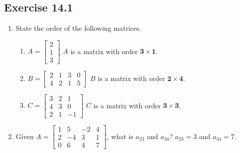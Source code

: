 \documentclass{report}
\begin{document}
\begin{multicols}{2}
  \singlespacing{}

  \subsection{Exercise 14.1}

  \begin{enumerate}
    \item State the order of the following matrices.

          \begin{enumerate}

            \item $A = \begin{bmatrix}
                      2 \\
                      1 \\
                      3
                    \end{bmatrix}$
                  \sol{}
                  $A$ is a matrix with order $\mathbf{3 \times 1}$.

            \item $B = \begin{bmatrix}
                      2 & 1 & 3 & 0 \\
                      4 & 2 & 1 & 5
                    \end{bmatrix}$
                  \sol{}
                  $B$ is a matrix with order $\mathbf{2 \times 4}$.

            \item $C = \begin{bmatrix}
                      3 & 2 & 1  \\
                      4 & 3 & 0  \\
                      2 & 1 & -1
                    \end{bmatrix}$
                  \sol{}
                  $C$ is a matrix with order $\mathbf{3 \times 3}$.

          \end{enumerate}

    \item Given $A = \begin{bmatrix}
              1 & 5  & -2 & 4 \\
              2 & -4 & 3  & 1 \\
              0 & 6  & 4  & 7
            \end{bmatrix}$, what is $a_{23}$ and $a_{34}$?
          \sol{}
          $a_{23} = 3$ and $a_{34} = 7$.


\end{enumerate}
\end{multicols}
\end{document}

